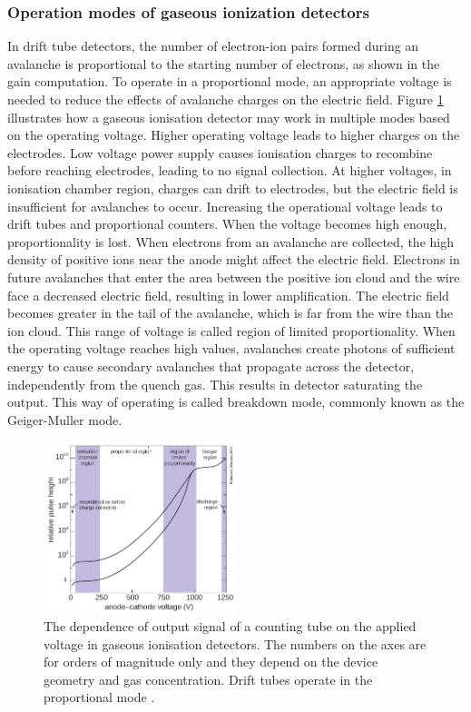 \subsubsection{Operation modes of gaseous ionization detectors}
In drift tube detectors, the number of electron-ion pairs formed during an avalanche is 
proportional to the starting number of electrons, as shown in the gain computation. To 
operate in a proportional mode, an appropriate voltage is needed to reduce the effects 
of avalanche charges on the electric field. Figure \ref{fig:gaseous} illustrates how a 
gaseous ionisation detector may work in multiple modes based on the operating voltage. Higher operating 
voltage leads to higher charges on the electrodes. Low voltage power supply causes ionisation charges to recombine 
before reaching electrodes, leading to no signal collection. At higher voltages, in ionisation chamber 
region, charges can drift to electrodes, but the electric field is insufficient for avalanches to occur. 
Increasing the operational voltage leads to drift tubes and proportional counters. When the voltage 
becomes high enough, proportionality is lost. When electrons from an avalanche are collected, 
the high density of positive ions near the anode might affect the electric field. 
Electrons in future avalanches that enter the area between the positive ion cloud and the wire face a 
decreased electric field, resulting in lower amplification. The electric field becomes greater in the 
tail of the avalanche, which is far from the wire than the ion cloud. This range of voltage is called region of 
limited proportionality. When the operating voltage reaches high values, 
avalanches create photons of sufficient energy to cause secondary avalanches 
that propagate across the detector, independently from the quench gas. 
This results in detector saturating the output. This way of operating is 
called breakdown mode, commonly known as the Geiger-Muller mode.
\begin{figure}[!h]
    \centering
    \includegraphics[width =0.5\textwidth]{figures/png/Screenshot_20240330_203416.png}
    \caption[The dependence of output signal of a counting tube 
    on the applied voltage in gaseous ionisation detectors.]
    {The dependence of output signal of a counting tube 
    on the applied voltage in gaseous ionisation detectors.  
      The numbers on the axes are for orders of magnitude only and they depend on the device geometry
      and gas concentration. 
    Drift tubes operate in the proportional mode \cite{kola}.}
    \label{fig:gaseous}
    \end{figure}
